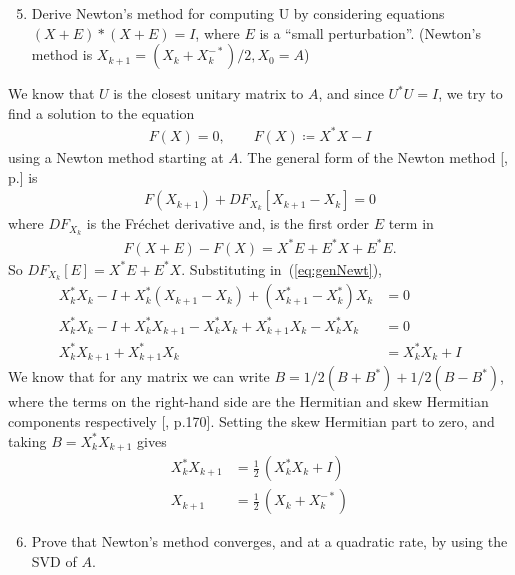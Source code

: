 \documentclass[10pt, A4paper]{article}
\begin{document}
\vspace{0.2cm}
\begin{enumerate}
	\setcounter{enumi}{4}
	\item Derive Newton's method for computing U by considering
	equations $(X+E)*(X+E) = I$, where $E$ is a ``small perturbation''.
	(Newton's method is $X_{k+1} = (X_k + X_k^{-*})/2, X_0 = A$)
\end{enumerate}

We know that $U$ is the closest unitary matrix to $A$, and since 
$U^*U=I$, we try to find a solution to the equation
\begin{align}
	F(X) = 0,\qquad F(X)\coloneqq X^*X - I
\end{align}
using a Newton method starting at $A$.
The general form of the Newton method [\cite{Kell2003}, p.] is
\begin{align}
	F(X_{k+1}) + DF_{X_k} \left[X_{k+1} - X_k\right] = 0
	\label{eq:genNewt}
\end{align}
where $DF_{X_k}$ is the Fréchet derivative and, is the first order $E$ 
term in
\begin{align}
	F(X+E) - F(X) = X^*E + E^*X + E^*E.
\end{align}
So $DF_{X_k}[E] = X^*E + E^*X$. Substituting in~(\ref{eq:genNewt}),
\begin{align}
	X_k^*X_k - I + X_k^* \left( X_{k+1} - X_k \right) + 
		\left( X_{k+1}^* - X_k^* \right)X_k &= 0 \\
	X_k^*X_k - I + X_k^* X_{k+1} - X_k^* X_k + 
		X_{k+1}^* X_k - X_k^*  X_k &= 0 \\
	X_k^* X_{k+1} + X_{k+1}^*X_k &= X_k^* X_k + I
\end{align}
We know that for any matrix we can write $B = 1/2(B + B^*) + 
1/2(B-B^*)$, where the terms on the right-hand side are the Hermitian 
and skew Hermitian components respectively [\citealp{hojo1985}, p.170].
Setting the skew Hermitian part to zero, and taking $B = X_k^*X_{k+1}$ 
gives
\begin{align}
	X_k^*X_{k+1} &= \frac{1}{2} \, (X_k^*X_k + I) \\
	X_{k+1} &= \frac{1}{2} \, (X_k + X_k^{-*})
	\label{eq:newton}
\end{align}


\vspace{0.2cm}
\begin{enumerate}
	\setcounter{enumi}{5}
	\item Prove that Newton's method converges, and at a quadratic
	rate, by using the SVD of $A$.
\end{enumerate}
\end{document}
